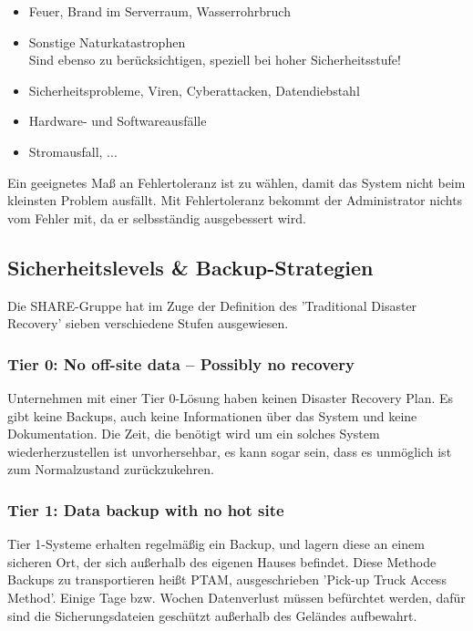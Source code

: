\documentclass[letterpaper, 12pt]{article}
\let\tempsubsection\subsection
\renewcommand\subsection[1]{\vspace{0cm}\tempsubsection{#1}\vspace{0cm}}
\let\tempsubsubsection\subsubsection
\renewcommand\subsubsection[1]{\vspace{0cm}\tempsubsubsection{#1}\vspace{0cm}}
\begin{document}
\begin{itemize}
	\item Feuer, Brand im Serverraum, Wasserrohrbruch
	\item Sonstige Naturkatastrophen \\
Sind ebenso zu berücksichtigen, speziell bei hoher Sicherheitsstufe!
	\item Sicherheitsprobleme, Viren, Cyberattacken, Datendiebstahl
	\item Hardware- und Softwareausfälle
	\item Stromausfall, ...
\end{itemize}

Ein geeignetes Maß an Fehlertoleranz ist zu wählen, damit das System nicht beim kleinsten Problem ausfällt. Mit Fehlertoleranz bekommt der Administrator nichts vom Fehler mit, da er selbsständig ausgebessert wird. \cite{ausarbeitungdis}

\subsection{Sicherheitslevels \& Backup-Strategien}

Die SHARE-Gruppe hat im Zuge der Definition des 'Traditional Disaster Recovery' sieben verschiedene Stufen ausgewiesen.

\subsubsection{Tier 0: No off-site data – Possibly no recovery}

Unternehmen mit einer Tier 0-Lösung haben keinen Disaster Recovery Plan. Es gibt keine Backups, auch keine Informationen über das System und keine Dokumentation. Die Zeit, die benötigt wird um ein solches System wiederherzustellen ist unvorhersehbar, es kann sogar
sein, dass es unmöglich ist zum Normalzustand zurückzukehren.

\subsubsection{Tier 1: Data backup with no hot site}

Tier 1-Systeme erhalten regelmäßig ein Backup, und lagern diese an einem sicheren Ort, der sich
außerhalb des eigenen Hauses befindet. Diese Methode
Backups zu transportieren heißt PTAM, ausgeschrieben ’Pick-up Truck Access Method’. Einige Tage bzw.
Wochen Datenverlust müssen befürchtet werden, dafür sind die Sicherungsdateien geschützt außerhalb des
Geländes aufbewahrt.
\end{document}
